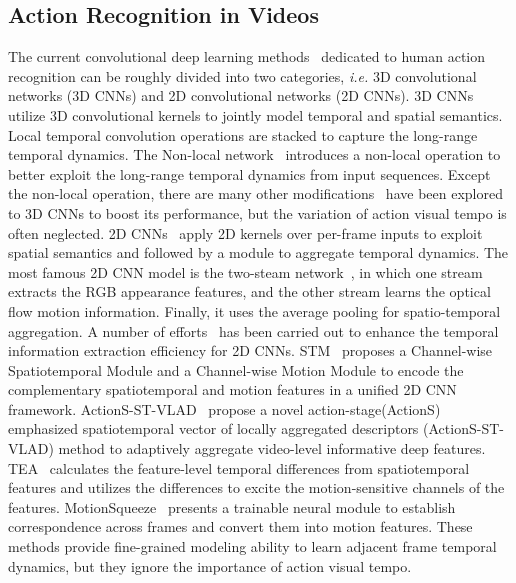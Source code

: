 \documentclass[journal]{IEEEtran}
\begin{document}
\subsection{Action Recognition in Videos}
The current convolutional deep learning methods~\cite{yang2020sta,ji2019context,tu2018semantic} dedicated to human action recognition can be roughly divided into two categories, \textit{i.e.} 3D convolutional networks (3D CNNs) and 2D convolutional networks (2D CNNs). 3D CNNs~\cite{tran2015learning,hara2018can,t2017Sabokrou,feichtenhofer2020x3d} utilize 3D convolutional kernels to jointly model temporal and spatial semantics. Local temporal convolution operations are stacked to capture the long-range temporal dynamics. The Non-local network~\cite{NonLocal2018} introduces a non-local operation to better exploit the long-range temporal dynamics from input sequences. Except the non-local operation, there are many other modifications~\cite{carreira2017quo,tran2018closer,piergiovanni2019representation} have been explored to 3D CNNs to boost its performance, but the variation of action visual tempo is often neglected. 2D CNNs~\cite{wang2016temporal,zhou2018temporal, lin2019tsm,t2021res2net} apply 2D kernels over per-frame inputs to exploit spatial semantics and followed by a module to aggregate temporal dynamics. The most famous 2D CNN model is the two-steam network~\cite{simonyan2014two,wang2016temporal,liu2019ntu}, in which one stream extracts the RGB appearance features, and the other stream learns the optical flow motion information. Finally, it uses the average pooling for spatio-temporal aggregation. A number of efforts~\cite{jiang2019stm,tu2019action,li2020tea,kwon2020motionsqueeze} has been carried out to enhance the temporal information extraction efficiency for 2D CNNs. STM~\cite{jiang2019stm} proposes a Channel-wise Spatiotemporal Module and a Channel-wise Motion Module to encode the complementary spatiotemporal and motion features in a unified 2D CNN framework.
ActionS-ST-VLAD~\cite{tu2019action} propose a novel action-stage(ActionS) emphasized spatiotemporal vector of locally aggregated descriptors (ActionS-ST-VLAD) method to adaptively aggregate video-level informative deep features.
TEA~\cite{li2020tea} calculates the feature-level temporal differences from spatiotemporal features and utilizes the differences to excite the motion-sensitive channels of the features. MotionSqueeze~\cite{kwon2020motionsqueeze} presents a trainable neural module to establish correspondence across frames and convert them into motion features. These methods provide fine-grained modeling ability to learn adjacent frame temporal dynamics, but they ignore the importance of action visual tempo.
\end{document}
